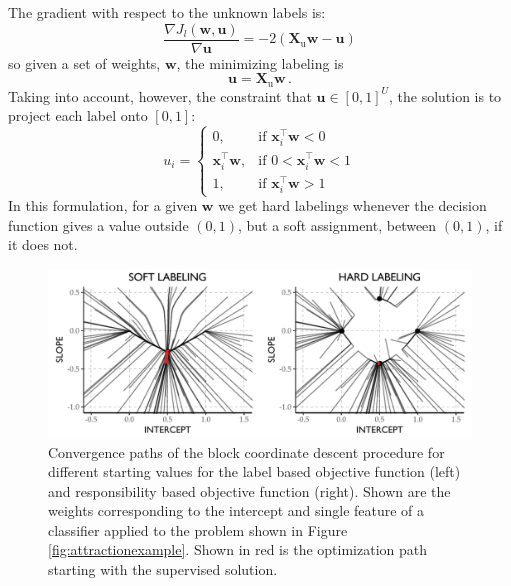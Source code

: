 \documentclass[twoside]{memoir}\usepackage[]{graphicx}\usepackage{xcolor}
\makeatletter
\def\maxwidth{ %
  \ifdim\Gin@nat@width>\linewidth
    \linewidth
  \else
    \Gin@nat@width
  \fi
}
\newenvironment{knitrout}{}{} %
\makeatother
\begin{document}
The gradient with respect to the unknown labels is:
$$
\frac{\nabla J_l(\mathbf{w},\mathbf{u})}{\nabla \mathbf{u}} = -2 (\mathbf{X}_\text{u} \mathbf{w} - \mathbf{u})
$$
so given a set of weights, $\mathbf{w}$, the minimizing labeling is 
$$\mathbf{u} = \mathbf{X}_\text{u} \mathbf{w} \,.$$
Taking into account, however, the constraint that $\mathbf{u} \in [0,1]^U$, the solution is to project each label onto $[0,1]$:
$$
u_i = 
\begin{cases}
0, & \text{if } \mathbf{x}_i^\top \mathbf{w} < 0\\
\mathbf{x}_i^\top \mathbf{w}, & \text{if } 0 < \mathbf{x}_i^\top \mathbf{w} < 1\\
1, & \text{if } \mathbf{x}_i^\top \mathbf{w} > 1
\end{cases}
$$
In this formulation, for a given $\mathbf{w}$ we get hard labelings whenever the decision function gives a value outside $(0,1)$, but a soft assignment, between $(0,1)$, if it does not.


\begin{knitrout}
\color{fgcolor}\begin{figure}
\includegraphics[width=\maxwidth]{figure/attraction1d-1} \caption{Convergence paths of the block coordinate descent procedure for different starting values for the label based objective function (left) and responsibility based objective function (right). Shown are the weights corresponding to the intercept and single feature of a classifier applied to the problem shown in Figure \ref{fig:attractionexample}. Shown in red is the optimization path starting with the supervised solution.}\label{fig:attraction1d}
\end{figure}


\end{knitrout}
\end{document}
